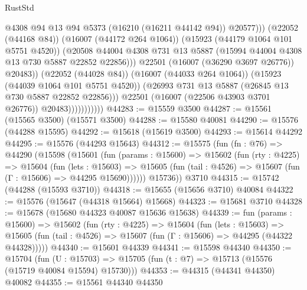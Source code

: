\begin{lexlean}{RustStd}
\begin{coremodule}
                                        @4308
                                        @94
                                        @13
                                        @94
                                        @5373
                                        (@16210 (@16211 @44142 @94))
                                        @20577)))
                                  (@22052 (@44168 @84))
                                  (@16007 (@44172 @264 @1064))
                                  (@15923 (@44179 @1064 @101 @5751 @4520))
                                  (@20508
                                    @44004
                                    @4308
                                    @731
                                    @13
                                    @5887
                                    (@15994 @44004 @4308 @13 @730 @5887 @22852 @22856)))
                                @22501
                                (@16007 (@36290 @3697 @26776))
                                @20483))
                            (@22052 (@44028 @84))
                            (@16007 (@44033 @264 @1064))
                            (@15923 (@44039 @1064 @101 @5751 @4520))
                            (@26993 @731 @13 @5887 (@26845 @13 @730 @5887 @22852 @22856)))
                          @22501
                          (@16007 (@22506 @43903 @3701 @26776))
                          @20483)))))))))))
@44283 := @15559 @3500
@44287 := @15561 (@15565 @3500) (@15571 @3500)
@44288 := @15580 @40081
@44290 := @15576 (@44288 @15595)
@44292 := @15618 (@15619 @3500)
@44293 := @15614 @44292
@44295 := @15576 (@44293 @15643)
@44312 := @15575
    (fun (fn : @76) =>
    @44290
      (@15598
        (@15601
          (fun (params : @15600) =>
          @15602
            (fun (rty : @4225) =>
            @15604
              (fun (lets : @15603) =>
              @15605 (fun (tail : @4526) => @15607 (fun (Γ : @15606) => @44295 @15690))))))
        @15736))
    @3710
@44315 := @15742 (@44288 (@15593 @3710))
@44318 := @15655 (@15656 @3710) @40084
@44322 := @15576 (@15647 (@44318 @15664) @15668)
@44323 := @15681 @3710
@44328 := @15678 (@15680 @44323 @40087 @15636 @15638)
@44339 := fun (params : @15600) =>
  @15602
    (fun (rty : @4225) =>
    @15604
      (fun (lets : @15603) =>
      @15605 (fun (tail : @4526) => @15607 (fun (Γ : @15606) => @44295 (@44322 @44328)))))
@44340 := @15601 @44339
@44341 := @15598 @44340
@44350 := @15704
    (fun (U : @15703) => @15705 (fun (t : @7) => @15713 (@15576 (@15719 @40084 @15594) @15730)))
@44353 := @44315 (@44341 @44350) @40082
@44355 := @15561 @44340 @44350

\end{coremodule}
\end{lexlean}

